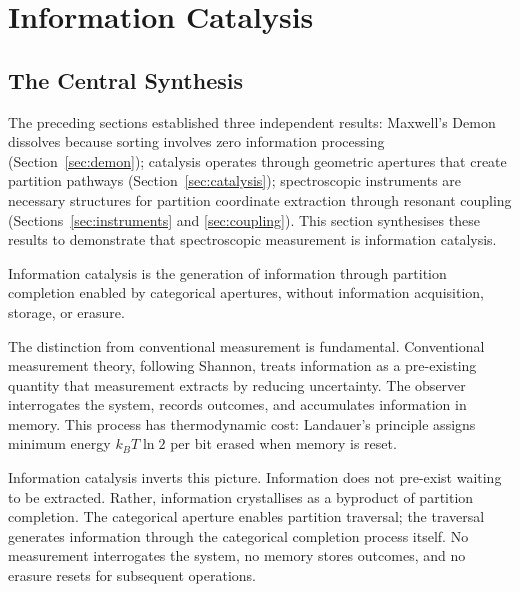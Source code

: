 \section{Information Catalysis}
\label{sec:catalysis_info}

\subsection{The Central Synthesis}

The preceding sections established three independent results: Maxwell's Demon dissolves because sorting involves zero information processing (Section~\ref{sec:demon}); catalysis operates through geometric apertures that create partition pathways (Section~\ref{sec:catalysis}); spectroscopic instruments are necessary structures for partition coordinate extraction through resonant coupling (Sections~\ref{sec:instruments} and \ref{sec:coupling}). This section synthesises these results to demonstrate that spectroscopic measurement is information catalysis.

\begin{definition}
\label{def:info_catalysis}
Information catalysis is the generation of information through partition completion enabled by categorical apertures, without information acquisition, storage, or erasure.
\end{definition}

The distinction from conventional measurement is fundamental. Conventional measurement theory, following Shannon, treats information as a pre-existing quantity that measurement extracts by reducing uncertainty. The observer interrogates the system, records outcomes, and accumulates information in memory. This process has thermodynamic cost: Landauer's principle assigns minimum energy $k_B T \ln 2$ per bit erased when memory is reset.

Information catalysis inverts this picture. Information does not pre-exist waiting to be extracted. Rather, information crystallises as a byproduct of partition completion. The categorical aperture enables partition traversal; the traversal generates information through the categorical completion process itself. No measurement interrogates the system, no memory stores outcomes, and no erasure resets for subsequent operations.


